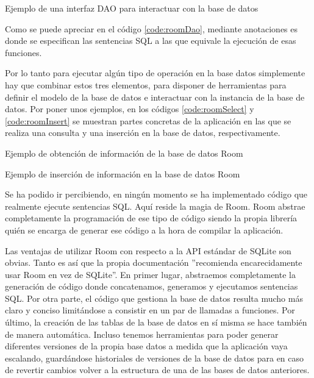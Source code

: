 \begin{code}
	\caption{Ejemplo de una interfaz DAO para interactuar con la base de datos}
	\label{code:roomDao}
	
\end{code}

Como se puede apreciar en el código \ref{code:roomDao}, mediante anotaciones es donde se especifican las sentencias SQL a las que equivale la ejecución de esas funciones.

Por lo tanto para ejecutar algún tipo de operación en la base datos simplemente hay que combinar estos tres elementos, para disponer de herramientas para definir el modelo de la base de datos e interactuar con la instancia de la base de datos. Por poner unos ejemplos, en los códigos \ref{code:roomSelect} y \ref{code:roomInsert} se muestran partes concretas de la aplicación en las que se realiza una consulta y una inserción en la base de datos, respectivamente.


\begin{code}
	\caption{Ejemplo de obtención de información de la base de datos Room}
	\label{code:roomSelect}
	
\end{code}

\begin{code}
	\caption{Ejemplo de inserción de información en la base de datos Room}
	\label{code:roomInsert}
	
\end{code}

Se ha podido ir percibiendo, en ningún momento se ha implementado código que realmente ejecute sentencias SQL. Aquí reside la magia de Room. Room abstrae completamente la programación de ese tipo de código siendo la propia librería quién se encarga de generar ese código a la hora de compilar la aplicación.

Las ventajas de utilizar Room con respecto a la API estándar de SQLite son obvias. Tanto es así que la propia documentación ''recomienda encarecidamente usar Room en vez de SQLite''\cite{room-training}. En primer lugar, abstraemos completamente la generación de código donde concatenamos, generamos y ejecutamos sentencias SQL. Por otra parte, el código que gestiona la base de datos resulta mucho más claro y conciso limitándose a consistir en un par de llamadas a funciones. Por último, la creación de las tablas de la base de datos en sí misma se hace también de manera automática. Incluso tenemos herramientas para poder generar diferentes versiones de la propia base datos a medida que la aplicación vaya escalando, guardándose historiales de versiones de la base de datos para en caso de revertir cambios volver a la estructura de una de las bases de datos anteriores.

